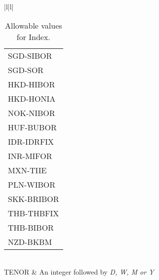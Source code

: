 \begin{table}[H]
\begin{supertabular}{|l|l|}
{\begin{tabular}[c]{@{}l@{}}
SGD-SIBOR\\ SGD-SOR \\
HKD-HIBOR \\ HKD-HONIA \\
NOK-NIBOR \\
HUF-BUBOR \\
IDR-IDRFIX \\
INR-MIFOR \\
MXN-TIIE \\
PLN-WIBOR \\
SKK-BRIBOR \\
THB-THBFIX\\ THB-BIBOR\\
NZD-BKBM \\
\end{tabular}} \\ \hline
TENOR                    & An integer followed by \emph{D, W, M or Y}                                                                                                                                                                                                                                                 \\ \hline
\end{supertabular}
  \caption{Allowable values for Index.}
  \label{tab:indices}
\end{table}

